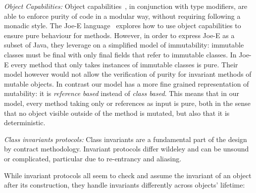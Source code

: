 \textit{Object Capabilities:}
Object capabilities~\cite{RobustComposition}, in conjunction with type modifiers, are able to
 enforce purity of code in a modular way, without requiring following a monadic style.
The Joe-E language~\cite{finifter2008verifiable} explores how to use object capabilities to ensure pure behaviour for methods.
However, in order to express Joe-E as a subset of Java, they leverage on a simplified model of immutability:
immutable classes must be final with only final fields that refer to immutable classes.
In Joe-E every method that only takes instances of immutable classes is pure.
Their model however would not allow the verification of purity for invariant methods of mutable objects.
In contrast our model has a more fine grained representation of mutability: it is \emph{reference based} instead of \emph{class based}.  This means that in our model, every method taking only \Q@read@ or \Q@imm@ references as input is pure,
both in the sense that no object visible outside of the method is mutated, but also that it is deterministic.

\textit{Class invariants protocols:}
Class invariants are a fundamental part of the design by contract methodology. 
Invariant protocols differ wildeley and can be unsound or complicated, particular due to re-entrancy and aliasing\cite{leino2004object,drossopoulou2008unified, meyer2016class}. 

While invariant protocols all seem to 
check and assume the invariant of an object after its construction, they handle invariants differently across objects' lifetime:


